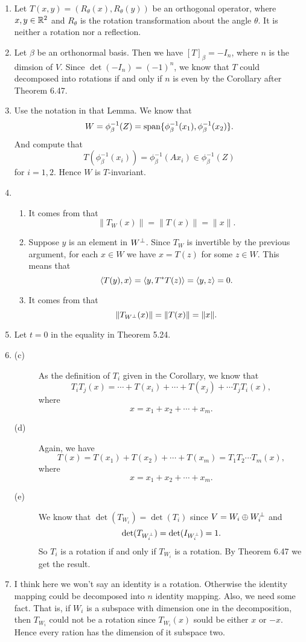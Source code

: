 \begin{enumerate}
\item Let $T(x,y)=(R_{\theta}(x),R_{\theta}(y))$ be an orthogonal operator, where $x,y\in \R^2$ and $R_{\theta}$ is the rotation transformation about the angle $\theta$. It is neither a rotation nor a reflection.
\item Let $\beta$ be an orthonormal basis. Then we have $[T]_{\beta}=-I_n$, where $n$ is the dimsion of $V$. Since $\det(-I_n)=(-1)^n$, we know that $T$ could decomposed into rotations if and only if $n$ is even by the Corollary after Theorem 6.47.
\item Use the notation in that Lemma. We know that 
\[W=\phi_{\beta}^{-1}(Z)=\sp\{\phi_{\beta}^{-1}(x_1),\phi_{\beta}^{-1}(x_2)\}.\]
And compute that 
\[T(\phi_{\beta}^{-1}(x_i))=\phi_{\beta}^{-1}(Ax_i)\in \phi_{\beta}^{-1}(Z)\]
for $i=1,2$. Hence $W$ is $T$-invariant.
\item \begin{enumerate}
\item It comes from that 
\[\|T_W(x)\|=\|T(x)\|=\|x\|.\]
\item Suppose $y$ is an element in $W\pp$. Since $T_W$ is invertible by the previous argument, for each $x\in W$ we have $x=T(z)$ for some $z\in W$. This means that 
\[\lag T(y),x\rag =\lag y,T^*T(z)\rag =\lag y,z\rag =0.\]
\item It comes from that 
\[\|T_{W\pp}(x)\|=\|T(x)\|=\|x\|.\]
\end{enumerate}
\item Let $t=0$ in the equality in Theorem 5.24.
\item \begin{description}
\item[(c)] As the definition of $T_i$ given in the Corollary, we know that 
\[T_iT_j(x)=\cdots +T(x_i)+\cdots +T(x_j)+\cdots T_jT_i(x),\]
where 
\[x=x_1+x_2+\cdots +x_m.\]
\item[(d)] Again, we have 
\[T(x)=T(x_1)+T(x_2)+\cdots +T(x_m)=T_1T_2\cdots T_m(x),\]
where 
\[x=x_1+x_2+\cdots +x_m.\]
\item[(e)] We know that $\det(T_{W_i})=\det(T_i)$ since $V=W_i\oplus W_i\pp$ and 
\[\det(T_{W_i\pp})=\det(I_{W_i\pp})=1.\]
So $T_i$ is a rotation if and only if $T_{W_i}$ is a rotation. By Theorem 6.47 we get the result.
\end{description}
\item I think here we won't say an identity is a rotation. Otherwise the identity mapping could be decomposed into $n$ identity mapping. Also, we need some fact. That is, if $W_i$ is a subspace with dimension one in the decomposition, then $T_{W_i}$ could not be a rotation since $T_{W_i}(x)$ sould be either $x$ or $-x$. Hence every ration has the dimension of it subspace two.

\end{enumerate}
